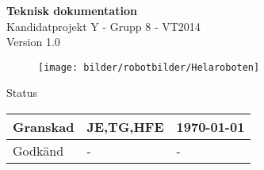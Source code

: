 \documentclass[a4paper,12pt,fleqn]{article}
\begin{document}
	\pagestyle{fancy}
	\vspace*{\fill}
		\begingroup
			\begin{center}
				\huge{\textbf{Teknisk dokumentation}}
				\\
				\vspace{5pt}
				\normalsize
				Kandidatprojekt Y - Grupp 8 - VT2014
				\\
				Version 1.0
				\end{center}
		\endgroup
	 
	\vspace{15pt}
	\begin{figure}[htp] %
	  \begin{center}
	  \texttt{[image: bilder/robotbilder/Helaroboten]}
	  \end{center}
	\end{figure}
	\vspace*{\fill}
	
	\begin{center} %
		Status
		\\
		\vspace{3pt} %
	    \begin{tabular}{| p{3cm} | p{3cm} | p{3cm} |} %
	    \hline %
	    Granskad & JE,TG,HFE & \today \\ \hline %
		Godkänd & - & - \\ \hline %

	    \end{tabular}
	\end{center}
	\vspace{2cm}
	\newpage
	
\end{document}
